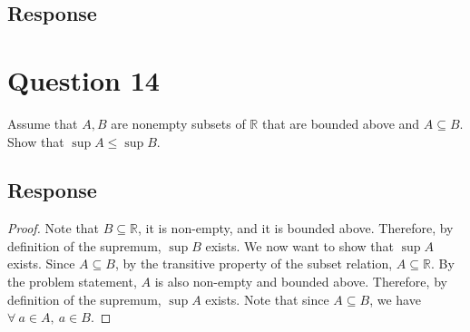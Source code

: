 \message{ !name(Problem_Set_2.tex)}\documentclass[13pt]{article}
\begin{document}
\subsection*{Response}

\newpage
\section*{Question 14}
Assume that $A, B$ are nonempty subsets of $\mathbb{R}$ that are bounded above and $A \subseteq
B$. Show that $\sup{A} \leq \sup{B}$.
\subsection*{Response}
\begin{proof}
  Note that $B \subseteq \mathbb{R}$, it is non-empty, and it is bounded above. Therefore, by definition of
  the supremum, $\sup{B}$ exists. We now want to show that $\sup{A}$ exists. Since $A \subseteq B$, by the
  transitive property of the subset relation, $A \subseteq \mathbb{R}$. By the problem statement, $A$ is also
  non-empty and bounded above. Therefore, by definition of the supremum, $\sup{A}$ exists. Note that since
  $A \subseteq B$, we have $\forall \ a \in A, \ a \in B$. 
\end{proof}
\end{document}
